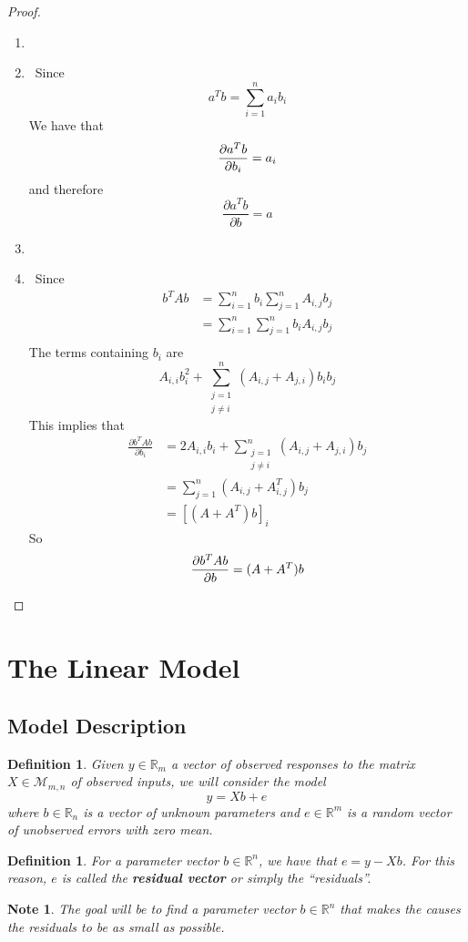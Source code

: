 \documentclass[12pt]{amsart}
\newcommand\Item[1][]{%
  \ifx\relax#1\relax  \item \else \item[#1] \fi
  \abovedisplayskip=0pt\abovedisplayshortskip=0pt~\vspace*{-\baselineskip}}
\newtheorem{defn}[thm]{Definition}
\newtheorem{note}[thm]{Note}
\newcommand{\R}{\mathbb{R}}
\newcommand{\MM}{\mathcal{M}}
\begin{document}
\begin{proof}\
\begin{enumerate}
\Item Since $$a^Tb = \sum_{i=1}^n a_ib_i$$ We have that $$\pdv{a^Tb}{b_i} = a_i$$ and therefore $$\frac{\partial a^Tb}{\partial b} = a$$ \vspace{3mm}
\Item Since 
\begin{align*}
b^T A b 
&= \sum_{i = 1}^n b_i \sum_{j=1}^n A_{i,j}b_j \\
&= \sum_{i = 1}^n \sum_{j=1}^n b_iA_{i,j}b_j \\
\end{align*}
The terms containing $b_i$ are $$A_{i,i}b_i^2 + \sum_{\substack{ j=1 \\ j \neq i}}^n (A_{i,j} + A_{j,i})b_ib_j$$
This implies that 
\begin{align*}
\frac{\partial b^TAb}{\partial b_i} 
&= 2A_{i,i}b_i + \sum_{\substack{j=1 \\ j\neq i}}^n (A_{i,j}+A_{j,i})b_j\\
&= \sum_{j=1}^n (A_{i,j}+A^T_{i,j})b_j\\
&= [(A+A^T)b]_i
\end{align*}
So $$\pdv{b^T A b}{b} = (A+A^T)b$$
\end{enumerate}
\end{proof} 

\section{The Linear Model}
\subsection{Model Description}
\begin{defn}
Given $y \in \R_m$ a vector of observed responses to the matrix $X \in \MM_{m,n}$ of observed inputs, we will consider the model $$y = Xb +e$$ where $b \in \R_n$ is a vector of unknown parameters and $e \in \R^m$ is a random vector of unobserved errors with zero mean. 
\end{defn}

\begin{defn}
For a parameter vector $b \in \R^n$, we have that  $e = y-Xb$. For this reason, $e$ is called the \textbf{residual vector} or simply the ``residuals''.
\end{defn}

\begin{note}
The goal will be to find a parameter vector $b \in \R^n$ that makes the causes the residuals to be as small as possible.  
\end{note}
\end{document}

